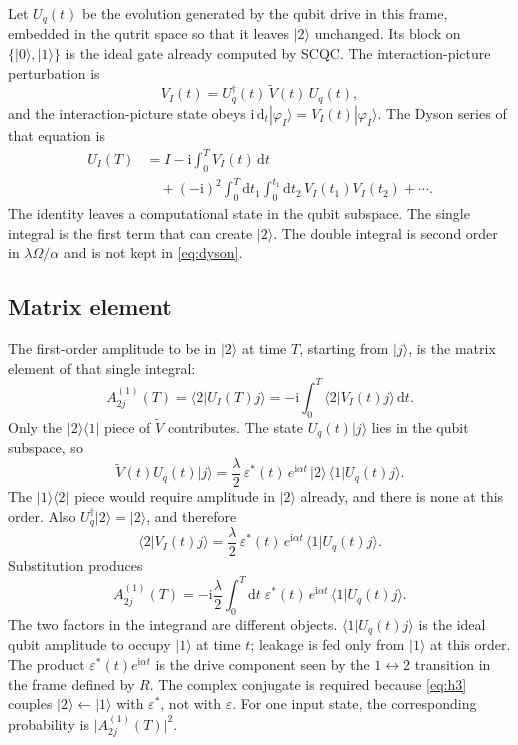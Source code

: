 \documentclass[11pt,a4paper]{article}
\theoremstyle{definition}
\newcommand{\ket}[1]{\lvert #1\rangle}
\newcommand{\bra}[1]{\langle #1\rvert}
\newcommand{\braket}[2]{\langle #1\vert #2\rangle}
\newcommand{\abs}[1]{\lvert #1\rvert}
\newcommand{\dd}{\mathrm{d}}
\newcommand{\ii}{\mathrm{i}}
\newcommand{\eps}{\varepsilon}
\begin{document}
Let \(U_q(t)\) be the evolution generated by the qubit drive in this frame,
embedded in the qutrit space so that it leaves \(\ket2\) unchanged.  Its block
on \(\{\ket0,\ket1\}\) is the ideal gate already computed by SCQC.  The
interaction-picture perturbation is
\begin{equation*}
  V_I(t)=U_q^\dagger(t)\,\tilde V(t)\,U_q(t),
\end{equation*}
and the interaction-picture state obeys
\(\ii\,\dd_t|\varphi_I\rangle=V_I(t)|\varphi_I\rangle\).  The Dyson series of
that equation is
\begin{equation*}
\begin{aligned}
  U_I(T)&=I-\ii\int_0^T V_I(t)\,\dd t\\
  &\quad+(-\ii)^2\int_0^T\dd t_1\int_0^{t_1}\dd t_2\,
    V_I(t_1)V_I(t_2)+\cdots.
\end{aligned}
\end{equation*}
The identity leaves a computational state in the qubit subspace.  The single
integral is the first term that can create \(\ket2\).  The double integral is
second order in \(\lambda\Omega/\alpha\) and is not kept in \eqref{eq:dyson}.

\subsection{Matrix element}

The first-order amplitude to be in \(\ket2\) at time \(T\), starting from
\(\ket j\), is the matrix element of that single integral:
\begin{equation*}
  A^{(1)}_{2j}(T)
  =\braket{2}{U_I(T)j}
  =-\ii\int_0^T\braket{2}{V_I(t)j}\,\dd t.
\end{equation*}
Only the \(\ket2\bra1\) piece of \(\tilde V\) contributes.  The state
\(U_q(t)\ket j\) lies in the qubit subspace, so
\begin{equation*}
  \tilde V(t)U_q(t)\ket j
  =\frac{\lambda}{2}\,\eps^*(t)\,e^{\ii\alpha t}\,
    \ket2\,\braket{1}{U_q(t)j}.
\end{equation*}
The \(\ket1\bra2\) piece would require amplitude in \(\ket2\) already, and
there is none at this order.  Also \(U_q^\dagger\ket2=\ket2\), and therefore
\begin{equation*}
  \braket{2}{V_I(t)j}
  =\frac{\lambda}{2}\,\eps^*(t)\,e^{\ii\alpha t}\,
    \braket{1}{U_q(t)j}.
\end{equation*}
Substitution produces
\begin{equation}
\label{eq:dyson}
  A^{(1)}_{2j}(T)
  =-\ii\frac{\lambda}{2}\int_0^T\dd t\;
    \eps^*(t)\,e^{\ii\alpha t}\,\braket{1}{U_q(t)j}.
\end{equation}
The two factors in the integrand are different objects.
\(\braket{1}{U_q(t)j}\) is the ideal qubit amplitude to occupy \(\ket1\) at
time \(t\); leakage is fed only from \(\ket1\) at this order.  The product
\(\eps^*(t)e^{\ii\alpha t}\) is the drive component seen by the
\(1\leftrightarrow 2\) transition in the frame defined by \(R\).  The complex
conjugate is required because \eqref{eq:h3} couples \(\ket2\leftarrow\ket1\)
with \(\eps^*\), not with \(\eps\).  For one input state, the corresponding
probability is \(\abs{A^{(1)}_{2j}(T)}^2\).
\end{document}
